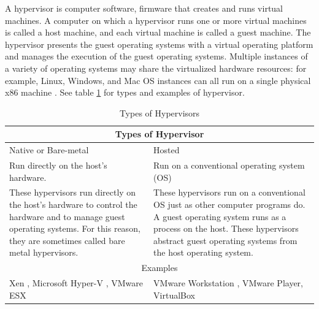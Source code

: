 A hypervisor is computer software, firmware that creates and runs virtual machines. A computer on which a hypervisor runs one or more virtual machines is called a host machine, and each virtual machine is called a guest machine. The hypervisor presents the guest operating systems with a virtual operating platform and manages the execution of the guest operating systems. Multiple instances of a variety of operating systems may share the virtualized hardware resources: for example, Linux, Windows, and Mac OS instances can all run on a single physical x86 machine \cite{hypervisor}. See table \ref{table:hypervisor_types} for types and examples of hypervisor.

\begin{table}
    \begin{tabular}{ p{70mm} | p{70mm} }
        \hline
        \multicolumn{2}{c}{Types of Hypervisor} \\
        \hline
        Native or Bare-metal & Hosted \\
        \hline
            Run directly on the host's hardware.& 
            Run on a conventional operating system (OS)\\
        \hline
            These hypervisors run directly on the host's hardware to control the hardware and to manage guest operating systems. For this reason, they are sometimes called bare metal hypervisors.& 
            These hypervisors run on a conventional OS just as other computer programs do. A guest operating system runs as a process on the host. These hypervisors abstract guest operating systems from the host operating system.   \\
        \hline
        \multicolumn{2}{c}{Examples} \\
        \hline
            Xen \cite{xen}, Microsoft Hyper-V \cite{Hyper-V}, VMware ESX \cite{VMware_ESXi} & 
            VMware Workstation \cite{VMware_Workstation}, VMware Player, VirtualBox \cite{VirtualBox} \\
        \hline
    \end{tabular}
    \caption{Types of Hypervisors}
    \label{table:hypervisor_types}
\end{table}

